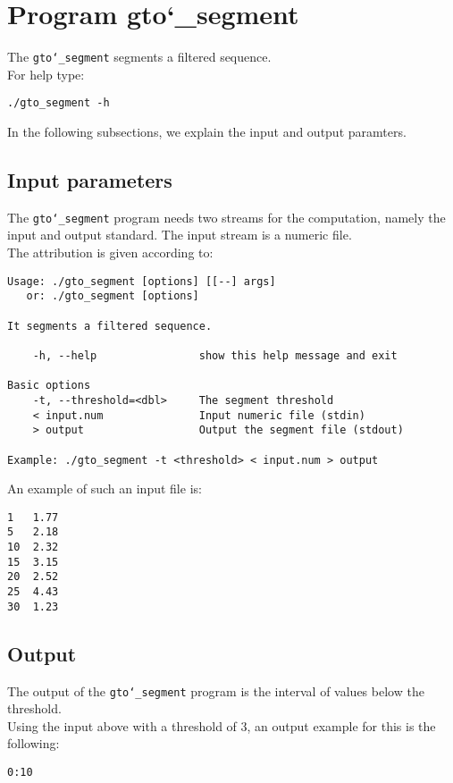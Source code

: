 \section{Program gto\char`_segment}
The \texttt{gto\char`_segment} segments a filtered sequence.\\
For help type:
\begin{lstlisting}
./gto_segment -h
\end{lstlisting}
In the following subsections, we explain the input and output paramters.

\subsection*{Input parameters}

The \texttt{gto\char`_segment} program needs two streams for the computation, namely the input and output standard. The input stream is a numeric file.\\
The attribution is given according to:
\begin{lstlisting}
Usage: ./gto_segment [options] [[--] args]
   or: ./gto_segment [options]

It segments a filtered sequence.

    -h, --help                show this help message and exit

Basic options
    -t, --threshold=<dbl>     The segment threshold
    < input.num               Input numeric file (stdin)
    > output                  Output the segment file (stdout)

Example: ./gto_segment -t <threshold> < input.num > output
\end{lstlisting}
An example of such an input file is:
\begin{lstlisting}
1   1.77
5   2.18
10  2.32
15  3.15
20  2.52
25  4.43
30  1.23
\end{lstlisting}

\subsection*{Output}
The output of the \texttt{gto\char`_segment} program is the interval of values ​​below the threshold.\\
Using the input above with a threshold of 3, an output example for this is the following:
\begin{lstlisting}
0:10
\end{lstlisting}